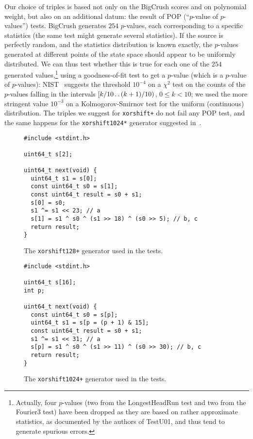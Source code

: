 \documentclass{acmsmalltr}
\def\..{\,\mathpunct{\ldotp\ldotp}}
\newcommand{\xorshifts}[1][]{\texttt{xorshift#1*}\xspace}
\newcommand{\xorshiftp}[1][]{\texttt{xorshift#1+}\xspace}
\begin{document}
Our choice of triples is based not only on the BigCrush scores and on polynomial
weight, but also on an additional datum: the result of POP
(``$p$-value of $p$-values'') tests. BigCrush generates $254$ $p$-values, each
corresponding to a specific statistics (the same test might generate several
statistics). If the source is perfectly random, and the statistics 
distribution is known exactly, the $p$-values generated at different points of
the state space should appear to be uniformly distributed. 
We can thus test whether this is true for each one of
the $254$ generated values,\footnote{Actually, four $p$-values (two from the LongestHeadRun test and two from the Fourier3 test) have been dropped as
they are based on rather approximate statistics, as documented by the authors of 
TestU01, and thus tend to generate spurious errors.} using a goodness-of-fit
test to get a $p$-value (which is a $p$-value of $p$-values):
NIST~\cite{RSNSTSRPNGCA} suggests the threshold $10^{-4}$ on a $\chi^2$ test on the counts of the $p$-values
falling in the intervals $[k/10\..(k+1)/10)$, $0\leq k<10$; we
used the more stringent value $10^{-3}$ on a Kolmogorov-Smirnov test for the
uniform (continuous) distribution. The triples we suggest for \xorshiftp do
not fail any POP test, and the same happens for the \xorshifts[1024] generator
suggested in~\cite{VigEEMXGS}.



\begin{figure}[ht]
\centering
\begin{verbatim}
#include <stdint.h>

uint64_t s[2];

uint64_t next(void) { 
  uint64_t s1 = s[0];
  const uint64_t s0 = s[1];
  const uint64_t result = s0 + s1;
  s[0] = s0;
  s1 ^= s1 << 23; // a
  s[1] = s1 ^ s0 ^ (s1 >> 18) ^ (s0 >> 5); // b, c
  return result; 
}
\end{verbatim}
\caption{\label{fig:code128}The \xorshiftp[128] generator used in the tests.}
\end{figure}



\begin{figure}[ht]
\centering
\begin{verbatim}
#include <stdint.h>

uint64_t s[16];
int p;

uint64_t next(void) {
  const uint64_t s0 = s[p];
  uint64_t s1 = s[p = (p + 1) & 15];
  const uint64_t result = s0 + s1;
  s1 ^= s1 << 31; // a
  s[p] = s1 ^ s0 ^ (s1 >> 11) ^ (s0 >> 30); // b, c
  return result;
}
\end{verbatim}
\caption{\label{fig:code1024}The \xorshiftp[1024] generator used
in the tests.}
\end{figure}
\end{document}
